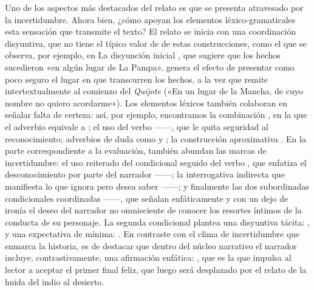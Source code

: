 Uno de los aspectos más destacados del relato es que se presenta atravesado por
la incertidumbre. Ahora bien, ¿cómo apoyan los elementos léxico-gramaticales
esta sensación que transmite el texto? El relato se inicia con una coordinación
disyuntiva, que no tiene el típico valor de  de estas
construcciones, como el que se observa, por ejemplo, en  La disyunción inicial
, que sugiere que los hechos sucedieron «en algún
lugar de La Pampa», genera el efecto de presentar como poco seguro el lugar en
que transcurren los hechos, a la vez que remite intertextualmente al comienzo
del \textit{Quijote} («En un lugar de la Mancha, de cuyo nombre no quiero
acordarme»). Los elementos léxicos también colaboran en señalar falta de
certeza: así, por ejemplo, encontramos la combinación ,
en la que el adverbio equivale a ; el uso del verbo
 ------, que le quita seguridad al
reconocimiento; adverbios de duda como  y ; la
construcción aproximativa . En la parte
correspondiente a la evaluación, también abundan las marcas de incertidumbre:
el uso reiterado del condicional seguido del verbo , que enfatiza
el desconocimiento por parte del narrador ------; la
interrogativa indirecta que manifiesta lo que ignora pero desea saber
------; y finalmente las dos
subordinadas condicionales coordinadas ------, que señalan enfáticamente y con un dejo de
ironía el deseo del narrador no omnisciente de conocer los resortes íntimos de
la conducta de su personaje. La segunda condicional plantea una disyuntiva
tácita: , y una expectativa de mínima:
. En contraste con el clima de incertidumbre que enmarca la
historia, es de destacar que dentro del núcleo narrativo el narrador incluye,
contrastivamente, una afirmación enfática: , que es la que
impulsa al lector a aceptar el primer final feliz, que luego será desplazado
por el relato de la huida del indio al desierto.

